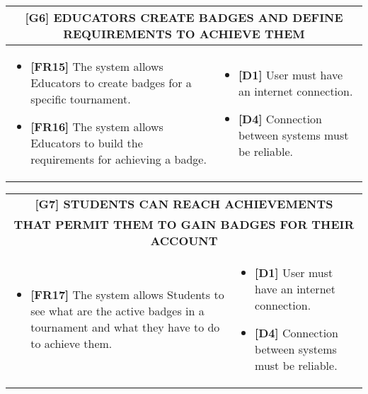 \documentclass{article}
\begin{document}
\begin{table}[H]
\begin{adjustwidth}{-1in}{-1in}
 \renewcommand{\arraystretch}{1.5}
    \begin{tabular}{|p{9.5cm}|p{9.5cm}|}
        \hline
        \multicolumn{2}{|c|}{\textbf{[G6] EDUCATORS CREATE BADGES AND DEFINE REQUIREMENTS TO ACHIEVE THEM}} \\
        \hline
        \begin{itemize}[label={}, left=0pt, align=left, itemsep=5pt]
            \item \textbf{[FR15]} The system allows Educators to create badges for a specific tournament.
            \item \textbf{[FR16]} The system allows Educators to build the requirements for achieving a badge.
        \end{itemize} &
        \begin{itemize}[label={}, left=0pt, align=left, itemsep=5pt]
            \item \textbf{[D1]} User must have an internet connection.
            \item \textbf{[D4]} Connection between systems must be reliable.
        \end{itemize} \\
        \hline
    \end{tabular}
\end{adjustwidth}
\end{table}

\begin{table}[H]
\begin{adjustwidth}{-1in}{-1in}
 \renewcommand{\arraystretch}{1.5}
    \begin{tabular}{|p{9.5cm}|p{9.5cm}|}
        \hline
        \multicolumn{2}{|c|}{\textbf{[G7] STUDENTS CAN REACH ACHIEVEMENTS}} \\
        \multicolumn{2}{|c|}{\textbf{THAT PERMIT THEM TO GAIN BADGES FOR THEIR ACCOUNT}} \\
        \hline
        \begin{itemize}[label={}, left=0pt, align=left, itemsep=5pt]
            \item \textbf{[FR17]} The system allows Students to see what are the active badges in a tournament and what they have to do to achieve them.
        \end{itemize} &
        \begin{itemize}[label={}, left=0pt, align=left, itemsep=5pt]
            \item \textbf{[D1]} User must have an internet connection.
            \item \textbf{[D4]} Connection between systems must be reliable.
        \end{itemize} \\
        \hline
    \end{tabular}
\end{adjustwidth}
\end{table}
\end{document}
